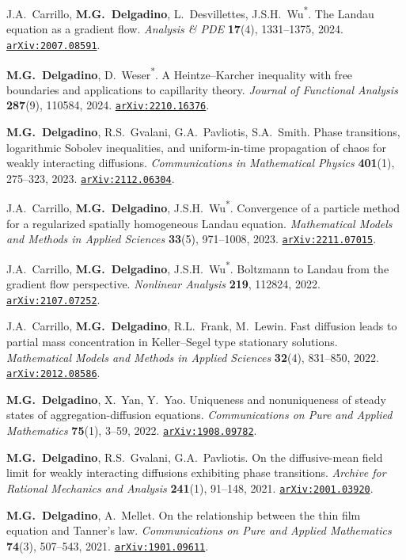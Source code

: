 \documentclass[11pt]{article}
\newcommand{\pub}[2]{%
  \par\addvspace{0.5ex}\noindent
  \begin{list}{}{%
    \setlength{\leftmargin}{2.4em}%
    \setlength{\labelwidth}{2.4em}%
    \setlength{\labelsep}{0.3em}%
  }%
  \item[{[#1]}] #2
  \end{list}
}
\newcommand{\arxiv}[1]{\href{https://arxiv.org/abs/#1}{\texttt{arXiv:#1}}}
\begin{document}
\pub{18}{J.A.~Carrillo, \textbf{M.G.~Delgadino}, L.~Desvillettes, J.S.H.~Wu\textsuperscript{*}. The Landau equation as a gradient flow. \emph{Analysis \& PDE} \textbf{17}(4), 1331--1375, 2024. \arxiv{2007.08591}.}

\pub{17}{\textbf{M.G.~Delgadino}, D.~Weser\textsuperscript{*}. A Heintze--Karcher inequality with free boundaries and applications to capillarity theory. \emph{Journal of Functional Analysis} \textbf{287}(9), 110584, 2024. \arxiv{2210.16376}.}

\pub{16}{\textbf{M.G.~Delgadino}, R.S.~Gvalani, G.A.~Pavliotis, S.A.~Smith. Phase transitions, logarithmic Sobolev inequalities, and uniform-in-time propagation of chaos for weakly interacting diffusions. \emph{Communications in Mathematical Physics} \textbf{401}(1), 275--323, 2023. \arxiv{2112.06304}.}

\pub{15}{J.A.~Carrillo, \textbf{M.G.~Delgadino}, J.S.H.~Wu\textsuperscript{*}. Convergence of a particle method for a regularized spatially homogeneous Landau equation. \emph{Mathematical Models and Methods in Applied Sciences} \textbf{33}(5), 971--1008, 2023. \arxiv{2211.07015}.}

\pub{14}{J.A.~Carrillo, \textbf{M.G.~Delgadino}, J.S.H.~Wu\textsuperscript{*}. Boltzmann to Landau from the gradient flow perspective. \emph{Nonlinear Analysis} \textbf{219}, 112824, 2022. \arxiv{2107.07252}.}

\pub{13}{J.A.~Carrillo, \textbf{M.G.~Delgadino}, R.L.~Frank, M.~Lewin. Fast diffusion leads to partial mass concentration in Keller--Segel type stationary solutions. \emph{Mathematical Models and Methods in Applied Sciences} \textbf{32}(4), 831--850, 2022. \arxiv{2012.08586}.}

\pub{12}{\textbf{M.G.~Delgadino}, X.~Yan, Y.~Yao. Uniqueness and nonuniqueness of steady states of aggregation-diffusion equations. \emph{Communications on Pure and Applied Mathematics} \textbf{75}(1), 3--59, 2022. \arxiv{1908.09782}.}

\pub{11}{\textbf{M.G.~Delgadino}, R.S.~Gvalani, G.A.~Pavliotis. On the diffusive-mean field limit for weakly interacting diffusions exhibiting phase transitions. \emph{Archive for Rational Mechanics and Analysis} \textbf{241}(1), 91--148, 2021. \arxiv{2001.03920}.}

\pub{10}{\textbf{M.G.~Delgadino}, A.~Mellet. On the relationship between the thin film equation and Tanner's law. \emph{Communications on Pure and Applied Mathematics} \textbf{74}(3), 507--543, 2021. \arxiv{1901.09611}.}
\end{document}

